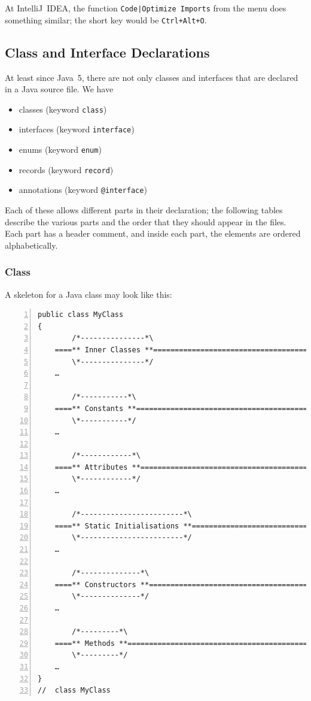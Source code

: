 \documentclass[12pt,a4paper,titlepage, parskip=half, headsepline, footsepline, cleardoubleplain]{scrbook}
\begin{document}
At IntelliJ~IDEA, the function \verb#Code|Optimize Imports# from the menu does something similar; the short key would be \verb#Ctrl+Alt+O#.

\subsection{Class and Interface Declarations}\label{sec:ClassAndInterfaceDeclarations}
At least since Java~5, there are not only classes and interfaces that are declared in a Java source file. We have

\begin{itemize}[nosep]
\item{classes (keyword \lstinline|class|)}
\item{interfaces (keyword \lstinline|interface|)}
\item{enums (keyword \lstinline|enum|)}
\item{records (keyword \lstinline|record|)}
\item{annotations (keyword \lstinline|@interface|)}
\end{itemize}

Each of these allows different parts in their declaration; the following tables describe the various parts and the order that they should appear in the files. Each part has a header comment, and inside each part, the elements are ordered alphabetically.

\subsubsection{Class}
A skeleton for a Java class may look like this:

\begin{lstlisting}[numbers=left,caption={Class Skeleton}]
public class MyClass 
{
        /*---------------*\
    ====** Inner Classes **==========================================
        \*---------------*/
    …    
        
        /*-----------*\
    ====** Constants **==============================================
        \*-----------*/
    …
        
        /*------------*\
    ====** Attributes **=============================================
        \*------------*/
    …
            
        /*------------------------*\
    ====** Static Initialisations **=================================
        \*------------------------*/
    …
        
        /*--------------*\
    ====** Constructors **===========================================
        \*--------------*/
    …
        
        /*---------*\
    ====** Methods **================================================
        \*---------*/
    …            
}
//  class MyClass
\end{lstlisting}
 
\end{document}
